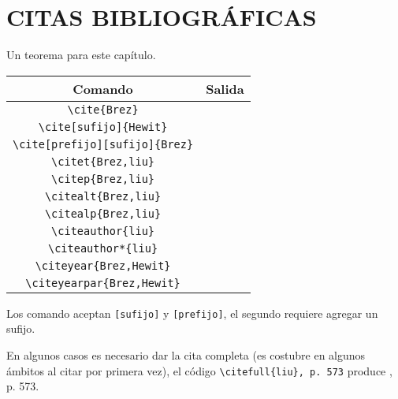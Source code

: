 \chapter{CITAS BIBLIOGRÁFICAS}

\begin{thm}
	Un teorema para este capítulo.
\end{thm}

\begin{center}
	\begin{tabular}{c|c}
		\hline
		Comando	& Salida  \\
		\hline
		\verb|\cite{Brez}| & \cite{Brez} \\
		\hline
		\verb|\cite[sufijo]{Hewit}| & \cite[sufijo]{Hewit} \\
		\hline
		\verb|\cite[prefijo][sufijo]{Brez}| & \cite[prefijo][sufijo]{Brez} \\
		\hline
		\verb|\citet{Brez,liu}| & \citet{Brez,liu} \\
		\hline
		\verb|\citep{Brez,liu}| & \citep{Brez,liu} \\
		\hline
		\verb|\citealt{Brez,liu}| & \citealt{Brez,liu} \\
		\hline
		\verb|\citealp{Brez,liu}| & \citealp{Brez,liu} \\
		\hline
		\verb|\citeauthor{liu}| & \citeauthor{liu} \\
		\hline
		\verb|\citeauthor*{liu}| & \citeauthor*{liu} \\
		\hline
		\verb|\citeyear{Brez,Hewit}| & \citeyear{Brez,Hewit} \\
		\hline
		\verb|\citeyearpar{Brez,Hewit}| & \citeyearpar{Brez,Hewit} \\
		\hline
	\end{tabular}
\end{center} Los comando aceptan \verb|[sufijo]| y \verb|[prefijo]|, el segundo requiere agregar un sufijo.

En algunos casos es necesario dar la cita completa (es costubre en algunos ámbitos al citar por primera vez), el código \verb|\citefull{liu}, p. 573| produce , p. 573.